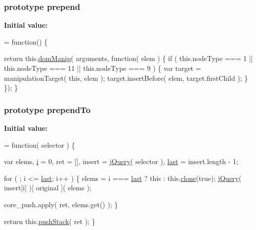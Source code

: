 \subsubsection[{prepend}]{ {\bf prototype} prepend}\label{jquery-1_810_82-vsdoc_8js_a2d1a98145e139b1aea1d95967466b151}
{\bfseries Initial value\+:}
\begin{DoxyCode}
= \textcolor{keyword}{function}() \{


        \textcolor{keywordflow}{return} this.\hyperlink{jquery-1_810_82-vsdoc_8js_a00a63bd312ef048290dc1755ccb8bae4}{domManip}( arguments, \textcolor{keyword}{function}( elem ) \{
            \textcolor{keywordflow}{if} ( this.nodeType === 1 || this.nodeType === 11 || this.nodeType === 9 ) \{
                var target = manipulationTarget( \textcolor{keyword}{this}, elem );
                target.insertBefore( elem, target.firstChild );
            \}
        \});
    \}
\end{DoxyCode}
\hypertarget{jquery-1_810_82-vsdoc_8js_a404bd77bf3be52acce1d4892d05c2c83}{}
\subsubsection[{prepend\+To}]{ {\bf prototype} prepend\+To}\label{jquery-1_810_82-vsdoc_8js_a404bd77bf3be52acce1d4892d05c2c83}
{\bfseries Initial value\+:}
\begin{DoxyCode}
= \textcolor{keyword}{function}( selector ) \{


        var elems,
            \hyperlink{_bibabook_2_scripts_2respond_8min_8js_a5e25b1d1bed9ab5f3174b76d6a722180}{i} = 0,
            ret = [],
            insert = \hyperlink{jquery-1_810_82-vsdoc_8js_add5237586d970a38a81f990e8eb28c6c}{jQuery}( selector ),
            \hyperlink{jquery-1_810_82-vsdoc_8js_a5a9684d230de11a6ec3029bcce128977}{last} = insert.length - 1;

        \textcolor{keywordflow}{for} ( ; i <= \hyperlink{jquery-1_810_82-vsdoc_8js_a5a9684d230de11a6ec3029bcce128977}{last}; i++ ) \{
            elems = i === \hyperlink{jquery-1_810_82-vsdoc_8js_a5a9684d230de11a6ec3029bcce128977}{last} ? \textcolor{keyword}{this} : this.\hyperlink{jquery-1_810_82-vsdoc_8js_a7d74ce76585989b4b6e2d506577e13ad}{clone}(\textcolor{keyword}{true});
            \hyperlink{jquery-1_810_82-vsdoc_8js_add5237586d970a38a81f990e8eb28c6c}{jQuery}( insert[i] )[ original ]( elems );

            
            core\_push.apply( ret, elems.get() );
        \}

        \textcolor{keywordflow}{return} this.\hyperlink{jquery-1_810_82-vsdoc_8js_afc3a7db1ef2b526338c06c07cecccd44}{pushStack}( ret );
    \}
\end{DoxyCode}
\hypertarget{jquery-1_810_82-vsdoc_8js_a7352f8050024693a3c6cce9e507d4af2}{}
